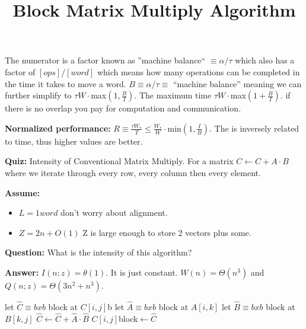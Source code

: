\documentclass{amsart}
\begin{document}
	The numerator is a factor known as ''machine balance`` $\equiv \alpha / \tau$ which also has a factor of $[ops]/[word]$ which means how many operations can be completed in the time it takes to move a word. $B \equiv \alpha / \tau \equiv $ ``machine balance'' meaning we can further simplify to $\tau W \cdot$max$(1,\frac{B}{I})$. The maximum time  $\tau W \cdot$max$(1 + \frac{B}{I})$. if there is no overlap you pay for computation and communication.
	
	\textbf{Normalized performance: } $R \equiv \frac{\tau W_*}{T} \leq \frac{W_*}{W} \cdot$min$(1,\frac{I}{B})$. The is inversely related to time, thus higher values are better.
	\begin{mdframed}[style=Quiz]
		\textbf{Quiz: } Intensity of Conventional Matrix Multiply. For a matrix $C \gets C + A \cdot B$ where we iterate through every row, every column then every element.
		
		\noindent
		\textbf{Assume:}
		\begin{itemize}
			\item $L = 1 word$ don't worry about alignment.
			\item $Z = 2n + O(1)$ Z is large enough to store 2 vectors plus some.
		\end{itemize}
		
		\noindent
		\textbf{Question:} What is the intensity of this algorithm?
		
		\noindent
		\textbf{Answer:} $I(n;z) = \theta(1)$. It is just constant. $W(n) = \Theta(n^3)$ and $Q(n;z) = \Theta(3n^2 + n^3)$.
	\end{mdframed}
	\clearpage
	\begin{algorithm}
		\title{Block Matrix Multiply Algorithm}
		\begin{algorithmic}
			\State let $\hat{C} \equiv bxb$ block at $C[i,j]$b
			\State let $\hat{A} \equiv bxb$ block at $A[i,k]$
			\State let $\hat{B} \equiv bxb$ block at $B[k,j]$
			\State $\hat{C} \gets \hat{C} + \hat{A} \cdot \hat{B}$
			\EndFor
			\State $C[i,j]$block$\gets\hat{C}$
			\EndFor
			\EndFor
		\end{algorithmic}
	\end{algorithm}
\end{document}
